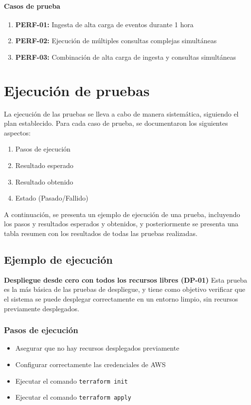 \paragraph{Casos de prueba}
\begin{enumerate}
    \item \textbf{PERF-01:} Ingesta de alta carga de eventos durante 1 hora
    \item \textbf{PERF-02:} Ejecución de múltiples consultas complejas simultáneas
    \item \textbf{PERF-03:} Combinación de alta carga de ingesta y consultas simultáneas
\end{enumerate}


\newpage{}
\section{Ejecución de pruebas}
La ejecución de las pruebas se lleva a cabo de manera sistemática, siguiendo
el plan establecido. Para cada caso de prueba, se documentaron los siguientes
aspectos:

\begin{enumerate}
    \item Pasos de ejecución
    \item Resultado esperado
    \item Resultado obtenido
    \item Estado (Pasado/Fallido)
\end{enumerate}

A continuación, se presenta un ejemplo de ejecución de una prueba, incluyendo
los pasos y resultados esperados y obtenidos, y posteriormente se presenta una
tabla resumen con los resultados de todas las pruebas realizadas.


\newpage{}
\subsection{Ejemplo de ejecución}
\textbf{Despliegue desde cero con todos los recursos libres (DP-01)}
Esta prueba es la más básica de las pruebas de despliegue, y tiene como
objetivo verificar que el sistema se puede desplegar correctamente en un
entorno limpio, sin recursos previamente desplegados.

\subsubsection{Pasos de ejecución}
\begin{itemize}
    \item Asegurar que no hay recursos desplegados previamente
    \item Configurar correctamente las credenciales de AWS
    \item Ejecutar el comando \texttt{terraform init}
    \item Ejecutar el comando \texttt{terraform apply}
\end{itemize}

